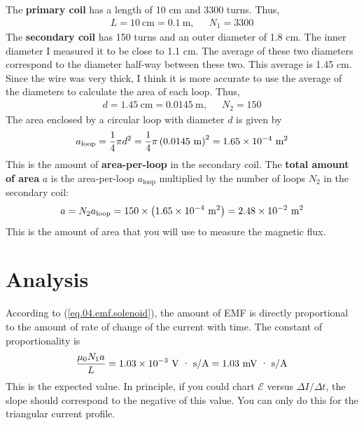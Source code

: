 The \textbf{primary coil} has a length of 10 cm and 3300 turns. Thus,
\begin{align}
	L = 10 \ \text{cm} = 0.1 \ \text{m,} && N_{1} = 3300
\end{align}
The \textbf{secondary coil} has 150 turns and an outer diameter of 1.8 cm. The inner diameter I measured it to be close to 1.1 cm. The average of these two diameters correspond to the diameter half-way between these two. This average is 1.45 cm. Since the wire was very thick, I think it is more accurate to use the average of the diameters to calculate the area of each loop. Thus,
\begin{align}
	d = 1.45 \ \text{cm} = 0.0145 \ \text{m,} && N_{2} = 150
\end{align}
The area enclosed by a circular loop with diameter $d$ is given by
\begin{equation}
	a_{\text{loop}} = \frac{1}{4} \pi d^{2} = \frac{1}{4} \pi \left(0.0145 \ \text{m}\right)^2 = 1.65 \times 10^{-4} \ \text{m\textsuperscript{2}}
\end{equation}
This is the amount of \textbf{area-per-loop} in the secondary coil. The \textbf{total amount of area} $a$ is the area-per-loop $a_{\text{loop}}$ multiplied by the number of loops $N_{2}$ in the secondary coil:
\begin{equation}
	a = N_{2} a_{\text{loop}} = 150 \times \left(1.65 \times 10^{-4} \ \text{m\textsuperscript{2}}\right) = 2.48 \times 10^{-2} \ \text{m\textsuperscript{2}}
\end{equation}
This is the amount of area that you will use to measure the magnetic flux.
%
\section{Analysis}
%
According to (\ref{eq.04.emf.solenoid}), the amount of EMF is directly proportional to the amount of rate of change of the current with time. The constant of proportionality is
\begin{equation}
	\frac{\mu_{0} N_{1} a}{L} = 1.03 \times 10^{-3} \ \text{V{ }\textperiodcentered{ }s/A} = 1.03 \ \text{mV{ }\textperiodcentered{ }s/A}
	\label{eq.04.slope}
\end{equation}
This is the expected value. In principle, if you could chart $\mathcal{E}$ versus $\Delta I / \Delta t$, the slope should correspond to the negative of this value. You can only do this for the triangular current profile.
%
